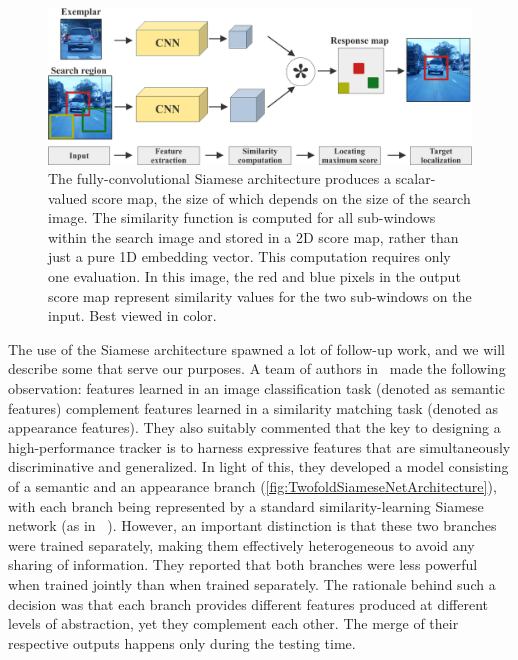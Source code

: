 \begin{figure}[t]
    \centerline{\includegraphics[width=0.7\linewidth]{figures/theoretical_foundations/fully_cnn_siam_tracking_architecture.pdf}}
    \caption[ architecture]{The fully-convolutional Siamese architecture produces a scalar-valued score map, the size of which depends on the size of the search image. The similarity function is computed for all sub-windows within the search image and stored in a 2D score map, rather than just a pure 1D embedding vector. This computation requires only one evaluation. In this image, the red and blue pixels in the output score map represent similarity values for the two sub-windows on the input. Best viewed in color. }
    \label{fig:FullyCNNSiamTrackingArch}
\end{figure}

The use of the Siamese architecture spawned a lot of follow-up work, and we will describe some that serve our purposes. A team of authors in~\cite{He2018} made the following observation: features learned in an image classification task (denoted as semantic features) complement features learned in a similarity matching task (denoted as appearance features). They also suitably commented that the key to designing a high-performance tracker is to harness expressive features that are simultaneously discriminative and generalized. In light of this, they developed a model consisting of a semantic and an appearance branch (\cref{fig:TwofoldSiameseNetArchitecture}), with each branch being represented by a standard similarity-learning Siamese network (as in ~\cite{Bertinetto2016}). However, an important distinction is that these two branches were trained separately, making them effectively heterogeneous to avoid any sharing of information. They reported that both branches were less powerful when trained jointly than when trained separately. The rationale behind such a decision was that each branch provides different features produced at different levels of abstraction, yet they complement each other. The merge of their respective outputs happens only during the testing time.

